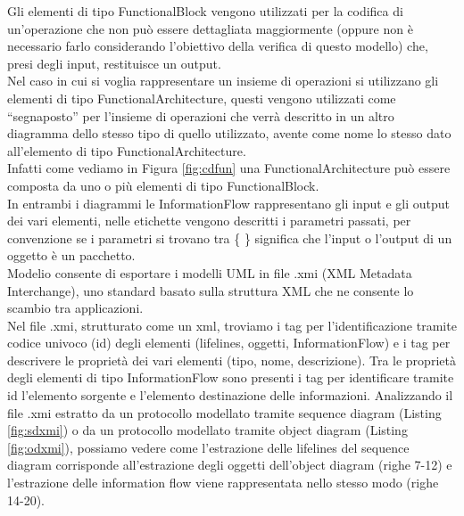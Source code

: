 \noindent Gli elementi di tipo FunctionalBlock vengono utilizzati per la codifica di un'operazione che non può essere dettagliata maggiormente (oppure non è necessario farlo considerando l'obiettivo della verifica di questo modello) che, presi degli input, restituisce un output.\\
Nel caso in cui si voglia rappresentare un insieme di operazioni si utilizzano gli elementi di tipo FunctionalArchitecture, questi vengono utilizzati come ``segnaposto'' per l'insieme di operazioni che verrà descritto in un altro diagramma dello stesso tipo di quello utilizzato, avente come nome lo stesso dato all'elemento di tipo FunctionalArchitecture.\\
Infatti come vediamo in Figura \ref{fig:cdfun} una FunctionalArchitecture può essere composta da uno o più elementi di tipo FunctionalBlock.\\
In entrambi i diagrammi le InformationFlow rappresentano gli input e gli output dei vari elementi, nelle etichette vengono descritti i parametri passati, per convenzione se i parametri si trovano tra \{ \} significa che l'input o l'output di un oggetto è un pacchetto.\\
Modelio consente di esportare i modelli UML in file .xmi (XML Metadata Interchange), uno standard basato sulla struttura XML che ne consente lo scambio tra applicazioni.\\
Nel file .xmi, strutturato come un xml, troviamo i tag per l'identificazione tramite codice univoco (id) degli elementi (lifelines, oggetti, InformationFlow) e i tag per descrivere le proprietà dei vari elementi (tipo, nome, descrizione). Tra le proprietà degli elementi di tipo InformationFlow sono presenti i tag per identificare tramite id l'elemento sorgente e l'elemento destinazione delle informazioni. Analizzando il file .xmi estratto da un protocollo modellato tramite sequence diagram (Listing \ref{fig:sdxmi}) o da un protocollo modellato tramite object diagram (Listing \ref{fig:odxmi}), possiamo vedere come l'estrazione delle lifelines del sequence diagram corrisponde all'estrazione degli oggetti dell'object diagram (righe 7-12) e l'estrazione delle information flow viene rappresentata nello stesso modo (righe 14-20).\\
\begin{minipage}{0.48\textwidth}
      \centering
      
    \end{minipage}\hfill
    \begin{minipage}{0.48\textwidth}
      \centering
       
\end{minipage}
\newpage

